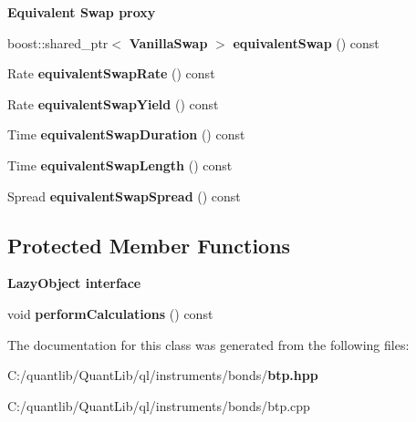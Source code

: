 \begin{Indent}{\bf Equivalent Swap proxy}\par
\begin{DoxyCompactItemize}
\item 
boost\+::shared\+\_\+ptr$<$ {\bf Vanilla\+Swap} $>$ {\bfseries equivalent\+Swap} () const \label{class_quant_lib_1_1_rendistato_calculator_ae37e7aa93b7cffbc0d16d599a1e9799c}

\item 
Rate {\bfseries equivalent\+Swap\+Rate} () const \label{class_quant_lib_1_1_rendistato_calculator_a2e1c6ac9a6baaf27cc85e96dd909e772}

\item 
Rate {\bfseries equivalent\+Swap\+Yield} () const \label{class_quant_lib_1_1_rendistato_calculator_aa3da6ffd9109c85ca78b608541921d24}

\item 
Time {\bfseries equivalent\+Swap\+Duration} () const \label{class_quant_lib_1_1_rendistato_calculator_a281481a76bd7dd61a20d5010fee878f9}

\item 
Time {\bfseries equivalent\+Swap\+Length} () const \label{class_quant_lib_1_1_rendistato_calculator_abd81ba1c8bda4d287e011274c428e6cd}

\item 
Spread {\bfseries equivalent\+Swap\+Spread} () const \label{class_quant_lib_1_1_rendistato_calculator_a31fe41b098467df9ccfc0b6d4eee2d77}

\end{DoxyCompactItemize}
\end{Indent}
\subsection*{Protected Member Functions}
\begin{Indent}{\bf Lazy\+Object interface}\par
\begin{DoxyCompactItemize}
\item 
void {\bfseries perform\+Calculations} () const \label{class_quant_lib_1_1_rendistato_calculator_aba1869e62de7c48d78fb9a06f2ed0156}

\end{DoxyCompactItemize}
\end{Indent}


The documentation for this class was generated from the following files\+:\begin{DoxyCompactItemize}
\item 
C\+:/quantlib/\+Quant\+Lib/ql/instruments/bonds/{\bf btp.\+hpp}\item 
C\+:/quantlib/\+Quant\+Lib/ql/instruments/bonds/btp.\+cpp\end{DoxyCompactItemize}
